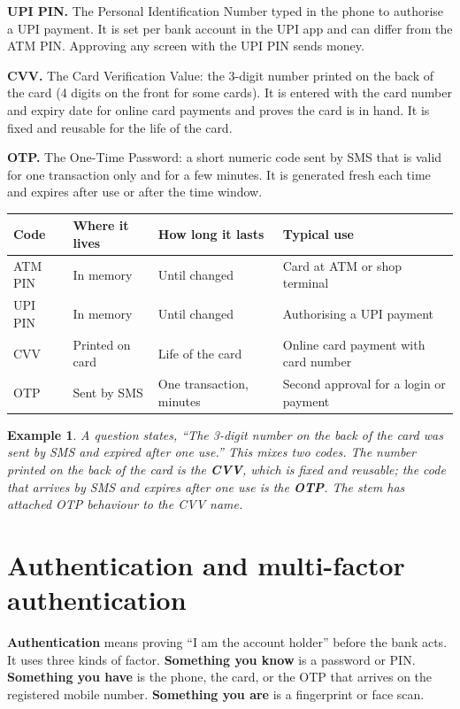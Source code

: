 \documentclass[11pt]{article}
\newtheorem{example}{Example}[section]
\begin{document}
\textbf{UPI PIN.} The Personal Identification Number typed in the phone to
authorise a UPI payment. It is set per bank account in the UPI app and can
differ from the ATM PIN. Approving any screen with the UPI PIN sends money.

\textbf{CVV.} The Card Verification Value: the 3-digit number printed on the
back of the card (4 digits on the front for some cards). It is entered with
the card number and expiry date for online card payments and proves the
card is in hand. It is fixed and reusable for the life of the card.

\textbf{OTP.} The One-Time Password: a short numeric code sent by SMS that
is valid for one transaction only and for a few minutes. It is generated
fresh each time and expires after use or after the time window.

\begin{center}
\begin{tabular}{p{}p{}p{}p{}}
\toprule
\textbf{Code} & \textbf{Where it lives} & \textbf{How long it lasts} & \textbf{Typical use} \\
\midrule
ATM PIN & In memory & Until changed & Card at ATM or shop terminal \\
UPI PIN & In memory & Until changed & Authorising a UPI payment \\
CVV & Printed on card & Life of the card & Online card payment with card number \\
OTP & Sent by SMS & One transaction, minutes & Second approval for a login or payment \\
\bottomrule
\end{tabular}
\end{center}

\begin{example}
A question states, ``The 3-digit number on the back of the card was sent by
SMS and expired after one use.'' This mixes two codes. The number printed on
the back of the card is the \textbf{CVV}, which is fixed and reusable; the
code that arrives by SMS and expires after one use is the \textbf{OTP}. The
stem has attached OTP behaviour to the CVV name.
\end{example}

\section{Authentication and multi-factor authentication}
\textbf{Authentication} means proving ``I am the account holder'' before the
bank acts. It uses three kinds of factor. \textbf{Something you know} is a
password or PIN. \textbf{Something you have} is the phone, the card, or the
OTP that arrives on the registered mobile number. \textbf{Something you are}
is a fingerprint or face scan.
\end{document}
